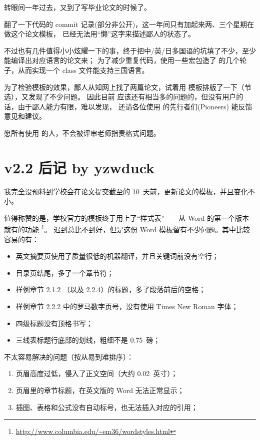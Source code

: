 转眼间一年过去，又到了写毕业论文的时候了。

翻了一下代码的 commit 记录(部分非公开)，这一年间只有加起来两、三个星期在做这个论文模板，
已经无法用“懒”这字来描述鄙人的状态了。

不过也有几件值得小小炫耀一下的事，终于把中/英/日多国语的坑填了不少，至少能编译出对应语言的论文来；
为了减少重复代码，使用一些宏包造了 \CTeX{} 的几个轮子，从而实现一个 class 文件能支持三国语言。

为了检验模板的效果，鄙人从知网上找了两篇论文，试着用 \nuaathesis{} 模板排版了一下（节选），又发现了不少问题。
因此目前 \nuaathesis{} 应该还有相当多的问题的，但没有用户的话，由于鄙人能力有限，难以发现，
还请各位使用 \nuaathesis{} 的先行者们(Pioneers) 能反馈意见和建议。

愿所有使用 \nuaathesis{} 的人，不会被评审老师指责格式问题。

\section{v2.2 后记 by yzwduck}

我完全没预料到学校会在论文提交截至的 10~天前，更新论文的模板，并且变化不小。

值得称赞的是，学校官方的模板终于用上了“样式表”——从 Word 的第一个版本就有的功能
\footnote{\url{http://www.columbia.edu/~em36/wordstyles.html}}。
迟到总比不到好，但是这份 Word 模板留有不少问题。其中比较容易的有：
\begin{itemize}
\item 英文摘要页使用了质量很低的机器翻译，并且关键词前没有空行；
\item 目录页结尾，多了一个章节符；
\item 样例章节 2.1.2 （以及 2.2.4）的标题，多了段落前后的空格；
\item 样例章节 2.2.2 中的罗马数字页号，没有使用 Times New Roman 字体；
\item 四级标题没有顶格书写；
\item 三线表标题行底部的划线，粗细不是 0.75~磅；
\end{itemize}

不太容易解决的问题（按从易到难排序）：
\begin{enumerate}
\item 页眉高度过低，侵入了正文空间（大约 0.02~英寸）；
\item 页眉里的章节标题，在英文版的 Word 无法正常显示；
\item 插图、表格和公式没有自动标号，也无法插入对应的引用；
\end{enumerate}

